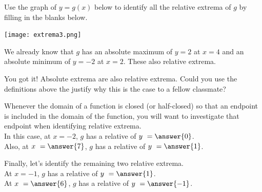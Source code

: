 \documentclass{ximera}
\begin{document}
\begin{exercise}
Use the graph of $y = g(x)$ below to identify all the relative extrema of $g$ by filling in the blanks below. 

\begin{center} \texttt{[image: extrema3.png]} \end{center}

We already know that $g$ has an absolute maximum of $y = 2$ at $x=4$ and an absolute minimum of $y=-2$ at $x=2$.  These  also relative extrema.  

\begin{feedback}[correct]
You got it!  Absolute extrema are also relative extrema.  Could you use the definitions above the justify why this is the case to a fellow classmate?
\end{feedback}

\begin{exercise}
Whenever the domain of a function is closed (or half-closed) so that an endpoint is included in the domain of the function, you will want to investigate that endpoint when identifying relative extrema.  \\

In this case, at $x = -2$, $g$ has a relative  of $y \ = \answer{0}$.  \\

Also, at $x \ =\answer{7}$, $g$ has a relative  of $y \ = \answer{1}$.  \\

\begin{exercise}
Finally, let's identify the remaining two relative extrema. \\

At $x = -1$, $g$ has a relative  of $y \ = \answer{1}$.  \\

At $x \ = \answer{6}$, $g$ has a relative  of $y \ = \answer{-1}$.  \\

\end{exercise}

\end{exercise}


\end{exercise}
\end{document}

